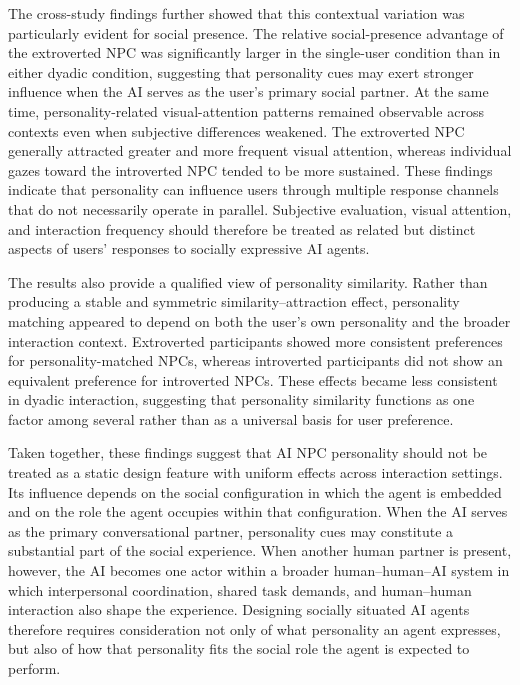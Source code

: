 \documentclass[a4paper,fleqn]{cas-sc}
\begin{document}
The cross-study findings further showed that this contextual variation was particularly evident for social presence. The relative social-presence advantage of the extroverted NPC was significantly larger in the single-user condition than in either dyadic condition, suggesting that personality cues may exert stronger influence when the AI serves as the user's primary social partner. At the same time, personality-related visual-attention patterns remained observable across contexts even when subjective differences weakened. The extroverted NPC generally attracted greater and more frequent visual attention, whereas individual gazes toward the introverted NPC tended to be more sustained. These findings indicate that personality can influence users through multiple response channels that do not necessarily operate in parallel. Subjective evaluation, visual attention, and interaction frequency should therefore be treated as related but distinct aspects of users' responses to socially expressive AI agents.

The results also provide a qualified view of personality similarity. Rather than producing a stable and symmetric similarity--attraction effect, personality matching appeared to depend on both the user's own personality and the broader interaction context. Extroverted participants showed more consistent preferences for personality-matched NPCs, whereas introverted participants did not show an equivalent preference for introverted NPCs. These effects became less consistent in dyadic interaction, suggesting that personality similarity functions as one factor among several rather than as a universal basis for user preference.

Taken together, these findings suggest that AI NPC personality should not be treated as a static design feature with uniform effects across interaction settings. Its influence depends on the social configuration in which the agent is embedded and on the role the agent occupies within that configuration. When the AI serves as the primary conversational partner, personality cues may constitute a substantial part of the social experience. When another human partner is present, however, the AI becomes one actor within a broader human--human--AI system in which interpersonal coordination, shared task demands, and human--human interaction also shape the experience. Designing socially situated AI agents therefore requires consideration not only of what personality an agent expresses, but also of how that personality fits the social role the agent is expected to perform.
\end{document}
